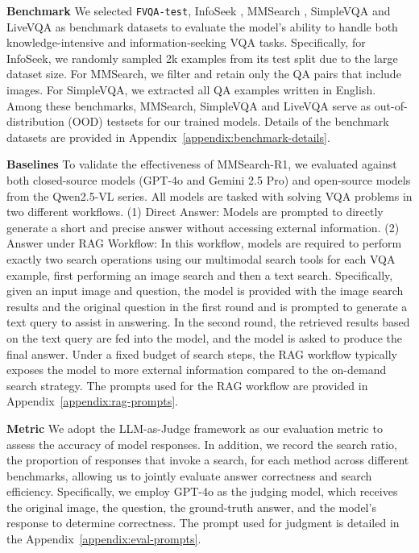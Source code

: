 \documentclass{article}
\begin{document}
\textbf{Benchmark} We selected \texttt{FVQA-test}, InfoSeek \cite{dataset/infoseek}, MMSearch \cite{vision-rag/mmsearch}, SimpleVQA \cite{dataset/simplevqa} and LiveVQA \cite{dataset/livevqa} as benchmark datasets to evaluate the model's ability to handle both knowledge-intensive and information-seeking VQA tasks. Specifically, for InfoSeek, we randomly sampled 2k examples from its test split due to the large dataset size. For MMSearch, we filter and retain only the QA pairs that include images. For SimpleVQA, we extracted all QA examples written in English. Among these benchmarks, MMSearch, SimpleVQA and LiveVQA serve as out-of-distribution (OOD) testsets for our trained models. Details of the benchmark datasets are provided in Appendix~\ref{appendix:benchmark-details}.

\textbf{Baselines} To validate the effectiveness of MMSearch-R1, we evaluated against both closed-source models (GPT-4o and Gemini 2.5 Pro) and open-source models from the Qwen2.5-VL series. All models are tasked with solving VQA problems in two different workflows. (1) Direct Answer: Models are prompted to directly generate a short and precise answer without accessing external information. (2) Answer under RAG Workflow: In this workflow, models are required to perform exactly two search operations using our multimodal search tools for each VQA example, first performing an image search and then a text search. Specifically, given an input image and question, the model is provided with the image search results and the original question in the first round and is prompted to generate a text query to assist in answering. In the second round, the retrieved results based on the text query are fed into the model, and the model is asked to produce the final answer. Under a fixed budget of search steps, the RAG workflow typically exposes the model to more external information compared to the on-demand search strategy. The prompts used for the RAG workflow are provided in Appendix~\ref{appendix:rag-prompts}.

\textbf{Metric} We adopt the LLM-as-Judge framework as our evaluation metric to assess the accuracy of model responses. In addition, we record the search ratio, the proportion of responses that invoke a search, for each method across different benchmarks, allowing us to jointly evaluate answer correctness and search efficiency. Specifically, we employ GPT-4o as the judging model, which receives the original image, the question, the ground-truth answer, and the model’s response to determine correctness. The prompt used for judgment is detailed in the Appendix~\ref{appendix:eval-prompts}.
\end{document}
